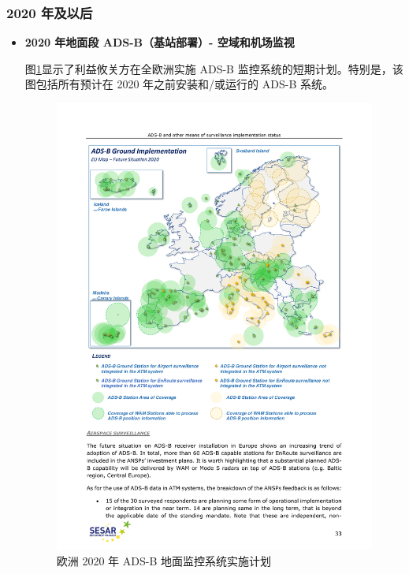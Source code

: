 \subsubsection{2020 年及以后}

\begin{itemize}

    \item \textbf{2020 年地面段 ADS-B（基站部署）- 空域和机场监视}

    图\ref{fig:20180515-sesar-ads-b-report_33}显示了利益攸关方在全欧洲实施 ADS-B 监控系统的短期计划。特别是，该图包括所有预计在 2020 年之前安装和/或运行的 ADS-B 系统。

    \begin{figure}[!htb]
    \centering
    \includegraphics[width=15cm]{pic/20180515-sesar-ads-b-report_33.pdf}
    \caption{欧洲 2020 年 ADS-B 地面监控系统实施计划\protect\footnotemark}
    \label{fig:20180515-sesar-ads-b-report_33}
    \end{figure}


\end{itemize}
